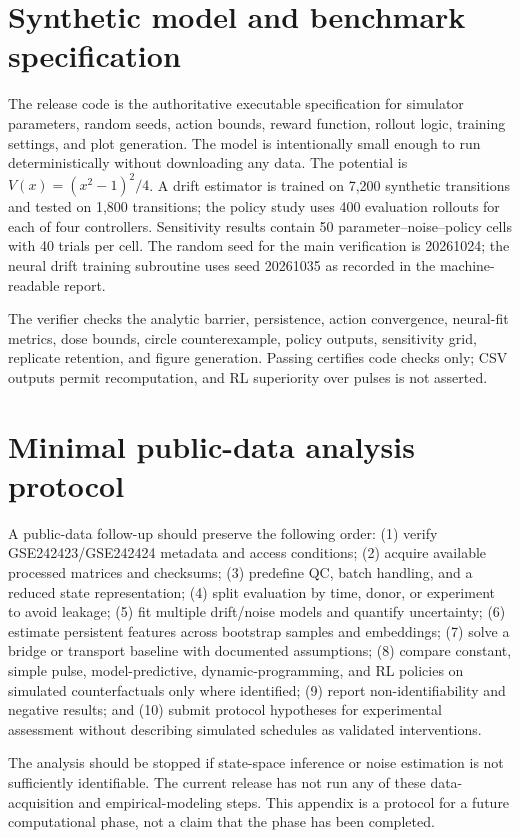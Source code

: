 \documentclass[11pt]{article}
\newcommand{\1}{\mathbf{1}}
\begin{document}
\clearpage
\section{Synthetic model and benchmark specification}
The release code is the authoritative executable specification for simulator parameters, random seeds, action bounds, reward function, rollout logic, training settings, and plot generation. The model is intentionally small enough to run deterministically without downloading any data. The potential is $V(x)=(x^2-1)^2/4$. A drift estimator is trained on 7,200 synthetic transitions and tested on 1,800 transitions; the policy study uses 400 evaluation rollouts for each of four controllers. Sensitivity results contain 50 parameter--noise--policy cells with 40 trials per cell. The random seed for the main verification is 20261024; the neural drift training subroutine uses seed 20261035 as recorded in the machine-readable report.

The verifier checks the analytic barrier, persistence, action convergence, neural-fit metrics, dose bounds, circle counterexample, policy outputs, sensitivity grid, replicate retention, and figure generation. Passing certifies code checks only; CSV outputs permit recomputation, and RL superiority over pulses is not asserted.

\section{Minimal public-data analysis protocol}
A public-data follow-up should preserve the following order: (1) verify GSE242423/GSE242424 metadata and access conditions; (2) acquire available processed matrices and checksums; (3) predefine QC, batch handling, and a reduced state representation; (4) split evaluation by time, donor, or experiment to avoid leakage; (5) fit multiple drift/noise models and quantify uncertainty; (6) estimate persistent features across bootstrap samples and embeddings; (7) solve a bridge or transport baseline with documented assumptions; (8) compare constant, simple pulse, model-predictive, dynamic-programming, and RL policies on simulated counterfactuals only where identified; (9) report non-identifiability and negative results; and (10) submit protocol hypotheses for experimental assessment without describing simulated schedules as validated interventions.

The analysis should be stopped if state-space inference or noise estimation is not sufficiently identifiable. The current release has not run any of these data-acquisition and empirical-modeling steps. This appendix is a protocol for a future computational phase, not a claim that the phase has been completed.
\end{document}
